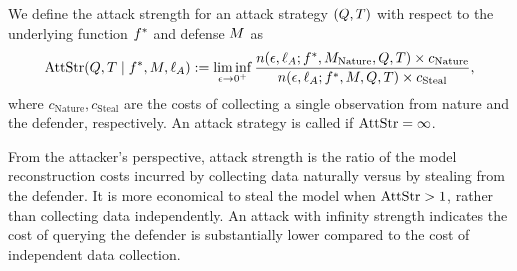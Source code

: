         
    \begin{definition}\label{def:atkstr}
            We define the attack strength for an attack strategy $(Q, T)$ with respect to the underlying function $f^*$ and defense $M$ as 
            \begin{align*}
            \textrm{AttStr}(Q,T \mid f^*,M,\ell_A) := 
            \liminf_{\epsilon \to 0^+} \frac{n(\epsilon,\ell_A;f^*,M_{\textrm{Nature}},Q,T) \times c_{\textrm{Nature}} }{ n(\epsilon,\ell_A;f^*,M,Q,T) \times c_{\textrm{Steal}} },
            \end{align*}
            where $c_{\textrm{Nature}}, c_{\textrm{Steal}}$ are the costs of collecting a single observation from nature and the defender, respectively. An attack strategy is called \eco if $\textrm{AttStr}=\infty$.
    \end{definition} 

    From the attacker's perspective, attack strength is the ratio of the model reconstruction costs incurred by collecting data naturally versus by stealing from the defender.  
    It is more economical to steal the model when $\textrm{AttStr} > 1$, rather than collecting data independently.
    An attack with infinity strength indicates the cost of querying the defender is substantially lower compared to the cost of independent data collection. 

